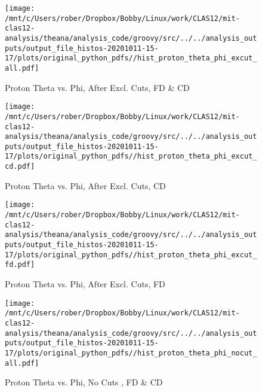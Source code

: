\documentclass{article}
\begin{document}
\begin{landscape}
    \begin{figure}[h]
        \centering

        \texttt{[image: /mnt/c/Users/rober/Dropbox/Bobby/Linux/work/CLAS12/mit-clas12-analysis/theana/analysis\_code/groovy/src/../../analysis\_outputs/output\_file\_histos-20201011-15-17/plots/original\_python\_pdfs//hist\_proton\_theta\_phi\_excut\_all.pdf]}
        \captionsetup{textformat=empty,labelformat=blank}
        \caption{Proton Theta vs. Phi, After Excl. Cuts, FD \& CD}
    \end{figure}
    \clearpage
    
    \begin{figure}[h]
        \centering

        \texttt{[image: /mnt/c/Users/rober/Dropbox/Bobby/Linux/work/CLAS12/mit-clas12-analysis/theana/analysis\_code/groovy/src/../../analysis\_outputs/output\_file\_histos-20201011-15-17/plots/original\_python\_pdfs//hist\_proton\_theta\_phi\_excut\_cd.pdf]}
        \captionsetup{textformat=empty,labelformat=blank}
        \caption{Proton Theta vs. Phi, After Excl. Cuts, CD}
    \end{figure}
    \clearpage
    
    \begin{figure}[h]
        \centering

        \texttt{[image: /mnt/c/Users/rober/Dropbox/Bobby/Linux/work/CLAS12/mit-clas12-analysis/theana/analysis\_code/groovy/src/../../analysis\_outputs/output\_file\_histos-20201011-15-17/plots/original\_python\_pdfs//hist\_proton\_theta\_phi\_excut\_fd.pdf]}
        \captionsetup{textformat=empty,labelformat=blank}
        \caption{Proton Theta vs. Phi, After Excl. Cuts, FD}
    \end{figure}
    \clearpage
    
    \begin{figure}[h]
        \centering

        \texttt{[image: /mnt/c/Users/rober/Dropbox/Bobby/Linux/work/CLAS12/mit-clas12-analysis/theana/analysis\_code/groovy/src/../../analysis\_outputs/output\_file\_histos-20201011-15-17/plots/original\_python\_pdfs//hist\_proton\_theta\_phi\_nocut\_all.pdf]}
        \captionsetup{textformat=empty,labelformat=blank}
        \caption{Proton Theta vs. Phi, No Cuts , FD \& CD}
    \end{figure}
    \clearpage
    
    \begin{figure}[h]
        \centering


\end{figure}
\end{landscape}
\end{document}
